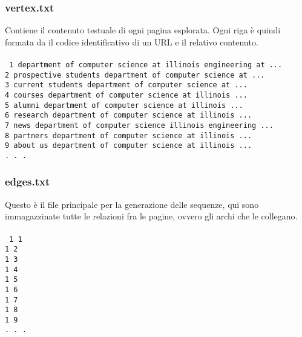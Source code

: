 \subsubsection{vertex.txt}
Contiene il contenuto testuale di ogni pagina esplorata. Ogni riga è quindi formata da il codice identificativo di un URL e il relativo contenuto.
\\\\
\texttt{
1	department of computer science at illinois engineering at ...\\
2	prospective students department of computer science at ...\\
3	current students department of computer science at ...\\
4	courses department of computer science at illinois ...\\
5	alumni department of computer science at illinois ...\\
6	research department of computer science at illinois    ...\\
7	news department of computer science illinois engineering ...\\
8	partners department of computer science at illinois ...\\
9	about us department of computer science at illinois ...\\
. . .\\
}
\subsubsection{edges.txt}
Questo è il file principale per la generazione delle sequenze, qui sono immagazzinate tutte le relazioni fra le pagine, ovvero gli archi che le collegano. 
\\\\
\texttt{
1	1\\
1	2\\
1	3\\
1	4\\
1	5\\
1	6\\
1	7\\
1	8\\
1	9\\
. . .\\
}
